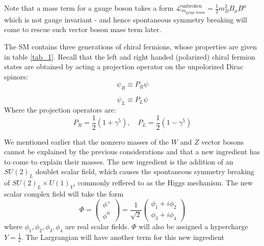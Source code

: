 \documentclass[11pt]{article}
\begin{document}
Note that a mass term for a gauge boson takes a form $\mathcal{L}_{m_{\text{gauge boson}}}^{\text{unbroken}}  =\frac{1}{2} m_{B}^{2} B_{\mu} B^{\mu}$ which is not gauge invariant - and hence spontaneous symmetry breaking will come to rescue such vector boson mass term later.

The SM contains three generations of chiral fermions, whose properties are given in table \ref{tab_1}. Recall that the left and right handed (polarized) chiral fermion states are obtained by acting a projection operator on the unpolorized Dirac spinors:
\begin{equation}
     \psi_{R} \equiv P_{R} \psi 
\end{equation}

\begin{equation}
     \psi_{L} \equiv P_{L} \psi 
\end{equation}
Where the projection operators are:
\begin{equation}
    P_{R}=\frac{1}{2}\left(1+\gamma^{5}\right), \quad P_{L}=\frac{1}{2}\left(1-\gamma^{5}\right)
\end{equation}

We mentioned earlier that the nonzero masses of the $W$ and $Z$ vector bosons cannot be explained by the previous considerations and that a new ingredient has to come to explain their masses. The new ingredient is the addition of an $SU(2)_L$ doublet scalar field, which causes the spontaneous symmetry breaking of $SU(2)_L \times U(1)_Y$, commonly reffered to as the Higgs mechanism. The new scalar complex field will take the form 
\begin{equation}
    \Phi=\left(\begin{array}{c}
\phi^{+} \\
\phi^{0}
\end{array}\right)=\frac{1}{\sqrt{2}}\left(\begin{array}{l}
\phi_{1}+i \phi_{2} \\
\phi_{3}+i \phi_{4}
\end{array}\right)
\label{phi}
\end{equation}
where $\phi_1, \phi_2, \phi_3, \phi_4$ are real scalar fields. $\Phi$ will also be assigned a hypercharge $Y=\frac{1}{2}$. The Largrangian will have another term for this new ingredient 
\end{document}
